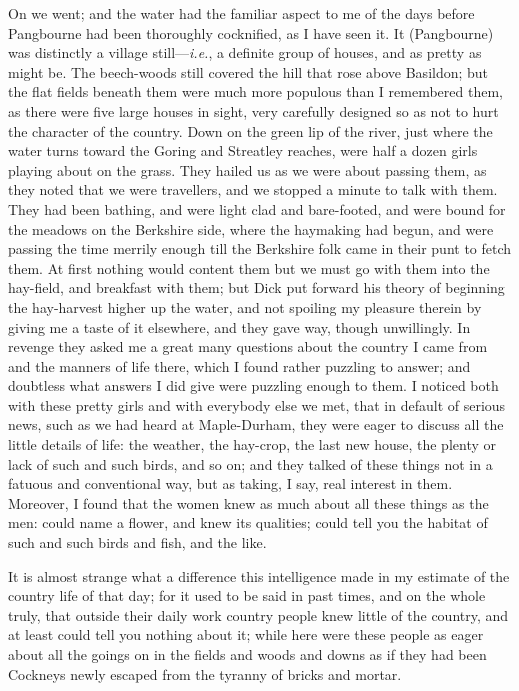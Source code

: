 On we went; and the water had the familiar aspect to me of the days
before Pangbourne had been thoroughly cocknified, as I have seen it. It
(Pangbourne) was distinctly a village still---\emph{i.e.}, a definite
group of houses, and as pretty as might be. The beech-woods still
covered the hill that rose above Basildon; but the flat fields beneath
them were much more populous than I remembered them, as there were five
large houses in sight, very carefully designed so as not to hurt the
character of the country. Down on the green lip of the river, just where
the water turns toward the Goring and Streatley reaches, were half a
dozen girls playing about on the grass. They hailed us as we were about
passing them, as they noted that we were travellers, and we stopped a
minute to talk with them. They had been bathing, and were light clad and
bare-footed, and were bound for the meadows on the Berkshire side, where
the haymaking had begun, and were passing the time merrily enough till
the Berkshire folk came in their punt to fetch them. At first nothing
would content them but we must go with them into the hay-field, and
breakfast with them; but Dick put forward his theory of beginning the
hay-harvest higher up the water, and not spoiling my pleasure therein by
giving me a taste of it elsewhere, and they gave way, though
unwillingly. In revenge they asked me a great many questions about the
country I came from and the manners of life there, which I found rather
puzzling to answer; and doubtless what answers I did give were puzzling
enough to them. I noticed both with these pretty girls and with
everybody else we met, that in default of serious news, such as we had
heard at Maple-Durham, they were eager to discuss all the little details
of life: the weather, the hay-crop, the last new house, the plenty or
lack of such and such birds, and so on; and they talked of these things
not in a fatuous and conventional way, but as taking, I say, real
interest in them. Moreover, I found that the women knew as much about
all these things as the men: could name a flower, and knew its
qualities; could tell you the habitat of such and such birds and fish,
and the like.

It is almost strange what a difference this intelligence made in my
estimate of the country life of that day; for it used to be said in past
times, and on the whole truly, that outside their daily work country
people knew little of the country, and at least could tell you nothing
about it; while here were these people as eager about all the goings on
in the fields and woods and downs as if they had been Cockneys newly
escaped from the tyranny of bricks and mortar.

